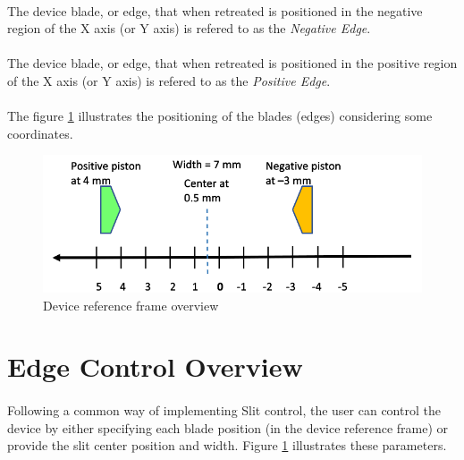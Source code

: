 \documentclass[openany]{article}
\begin{document}
    \paragraph{} The device blade, or edge, that when retreated is positioned in the negative region of the X axis (or Y axis) is refered to as the \emph{Negative Edge}.

    \paragraph{} The device blade, or edge, that when retreated is positioned in the positive region of the X axis (or Y axis) is refered to as the \emph{Positive Edge}.

    \paragraph{} The figure \ref{fig:ref-frame} illustrates the positioning of the blades (edges) considering some coordinates.

    \begin{figure}[!h]
        \caption{Device reference frame overview}
        \label{fig:ref-frame}
        \centering
        \includegraphics[width=1.0\textwidth]{diff_ctrl_ref_frame}
    \end{figure}
    \FloatBarrier


\section{Edge Control Overview}

    \paragraph{} Following a common way of implementing Slit control, the user can control the device by either specifying each blade position (in the device reference frame) or provide the slit center position and width. Figure \ref{fig:ref-frame} illustrates these parameters.
\end{document}
